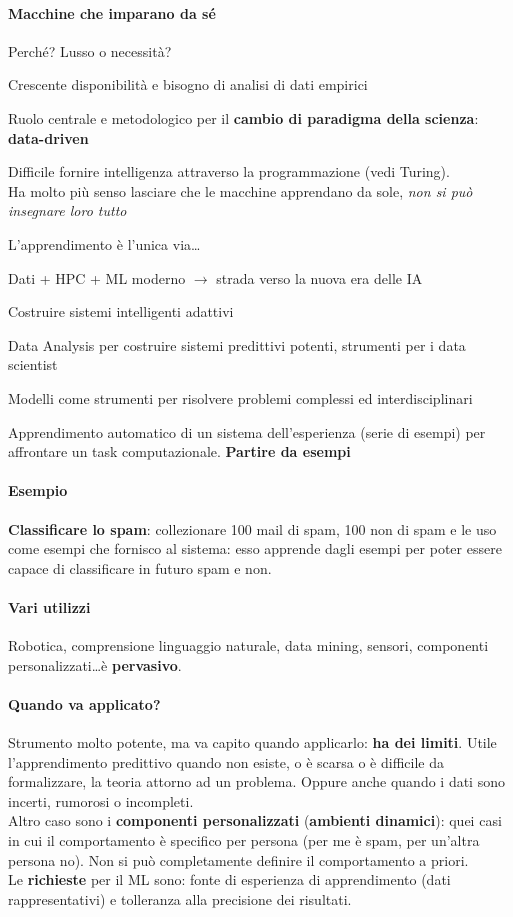 \documentclass[10pt]{book}
\begin{document}
\paragraph{Macchine che imparano da sé} Perché? Lusso o necessità?
\begin{list}{-}{}
	\item Crescente disponibilità e bisogno di analisi di dati empirici
	\item Ruolo centrale e metodologico per il \textbf{cambio di paradigma della scienza}: \textbf{data-driven}
	\item Difficile fornire intelligenza attraverso la programmazione (vedi Turing).\\
	Ha molto più senso lasciare che le macchine apprendano da sole, \textit{non si può insegnare loro tutto}
	\item L'apprendimento è l'unica via\ldots
\end{list}
Dati + HPC + ML moderno $\rightarrow$ strada verso la nuova era delle IA
\begin{list}{}{\textbf{Obiettivi}}
	\item Costruire sistemi intelligenti adattivi
	\item Data Analysis per costruire sistemi predittivi potenti, strumenti per i data scientist
	\item Modelli come strumenti per risolvere problemi complessi ed interdisciplinari
\end{list}
Apprendimento automatico di un sistema dell'esperienza (serie di esempi) per affrontare un task computazionale. \textbf{Partire da esempi}
\paragraph{Esempio} \textbf{Classificare lo spam}: collezionare 100 mail di spam, 100 non di spam e le uso come esempi che fornisco al sistema: esso apprende dagli esempi per poter essere capace di classificare in futuro spam e non.
\paragraph{Vari utilizzi} Robotica, comprensione linguaggio naturale, data mining, sensori, componenti personalizzati\ldots è \textbf{pervasivo}.
\paragraph{Quando va applicato?} Strumento molto potente, ma va capito quando applicarlo: \textbf{ha dei limiti}. Utile l'apprendimento predittivo quando non esiste, o è scarsa o è difficile da formalizzare, la teoria attorno ad un problema. Oppure anche quando i dati sono incerti, rumorosi o incompleti.\\
Altro caso sono i \textbf{componenti personalizzati} (\textbf{ambienti dinamici}): quei casi in cui il comportamento è specifico per persona (per me è spam, per un'altra persona no). Non si può completamente definire il comportamento a priori.\\
Le \textbf{richieste} per il ML sono: fonte di esperienza di apprendimento (dati rappresentativi) e tolleranza alla precisione dei risultati.
\end{document}
